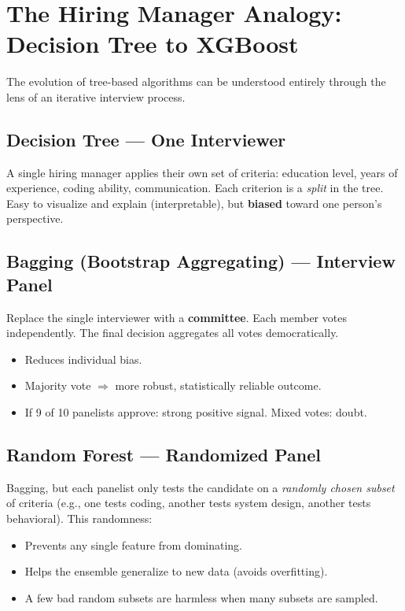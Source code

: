 \documentclass[11pt]{article}
\begin{document}
\newpage
\section{The Hiring Manager Analogy: Decision Tree to XGBoost}

The evolution of tree-based algorithms can be understood entirely through the lens of
an iterative interview process.

\subsection{Decision Tree --- One Interviewer}
A single hiring manager applies their own set of criteria: education level, years of
experience, coding ability, communication. Each criterion is a \emph{split} in the tree.
Easy to visualize and explain (interpretable), but \textbf{biased} toward one person's
perspective.

\subsection{Bagging (Bootstrap Aggregating) --- Interview Panel}
Replace the single interviewer with a \textbf{committee}. Each member votes independently.
The final decision aggregates all votes democratically.
\begin{itemize}
    \item Reduces individual bias.
    \item Majority vote $\Rightarrow$ more robust, statistically reliable outcome.
    \item If 9 of 10 panelists approve: strong positive signal. Mixed votes: doubt.
\end{itemize}

\subsection{Random Forest --- Randomized Panel}
Bagging, but each panelist only tests the candidate on a \emph{randomly chosen subset}
of criteria (e.g., one tests coding, another tests system design, another tests
behavioral). This randomness:
\begin{itemize}
    \item Prevents any single feature from dominating.
    \item Helps the ensemble generalize to new data (avoids overfitting).
    \item A few bad random subsets are harmless when many subsets are sampled.
\end{itemize}
\end{document}
